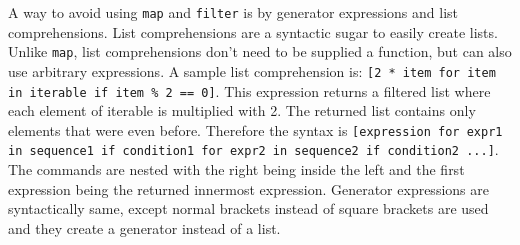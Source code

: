 A way to avoid using \verb;map; and \verb;filter; is by generator expressions
and list comprehensions. List comprehensions are a syntactic sugar to easily
create lists. Unlike \verb;map;, list comprehensions don't need to be supplied a
function, but can also use arbitrary expressions. A sample list comprehension
is: \verb;[2 * item for item in iterable if item % 2 == 0];. This expression
returns a filtered list where each element of iterable is multiplied with 2. The
returned list contains only elements that were even before. Therefore the syntax
is
\verb;[expression for expr1 in sequence1 if condition1 for expr2 in sequence2 if condition2 ...];.
The commands are nested with the right being inside the left and the first expression being the returned innermost expression. Generator expressions are syntactically same, except normal brackets instead of square brackets are used and they create a generator instead of a
list.